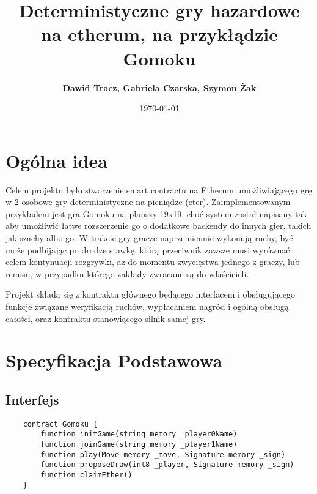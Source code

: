 \documentclass[a4paper, 12pt, onecolumn, one]{article}
\title{\textbf{Deterministyczne gry hazardowe na etherum, na przykłądzie Gomoku}}
\author{\textbf{Dawid Tracz, Gabriela Czarska, Szymon Żak}}
\date{\today}
\begin{document}

\renewcommand{\figurename}{\textbf{\small{}Ilustracja}}
\renewcommand{\tablename}{\textbf{\small{}Tabela}}
\newcommand{\specialcell}[2][c]{%
  \begin{tabular}[#1]{@{}c@{}}#2\end{tabular}}
\newcommand{\rpm}{\raisebox{.2ex}{$\scriptstyle\pm$}} %

  \maketitle


\section{Ogólna idea}
	Celem projektu było stworzenie smart contractu na Etherum umożliwiającego grę w 2-osobowe gry deterministyczne na pieniądze (eter). Zaimplementowanym przykładem jest gra Gomoku na planszy 19x19, choć system został napisany tak aby umożliwić łatwe rozszerzenie go o dodatkowe backendy do innych gier, takich jak szachy albo go. W trakcie gry gracze naprzemiennie wykonują ruchy, być może podbijając po drodze stawkę, którą przeciwnik zawsze musi wyrównać celem kontynuacji rozgrywki, aż do momentu zwycięstwa jednego z graczy, lub remisu, w przypadku którego zakłady zwracane są do właścicieli.
	
	Projekt składa się z kontraktu głównego będącego interfacem i obsługującego funkcje związane weryfikacją ruchów, wypłacaniem nagród i ogólną obsługą całości, oraz kontraktu stanowiącego silnik samej gry.
	
\section{Specyfikacja Podstawowa}
  \subsection{Interfejs}
	
	\begin{lstlisting}
	contract Gomoku {
		function initGame(string memory _player0Name)
		function joinGame(string memory _player1Name)
		function play(Move memory _move, Signature memory _sign)
		function proposeDraw(int8 _player, Signature memory _sign)
		function claimEther()
	}
	\end{lstlisting}
	
\end{document}
